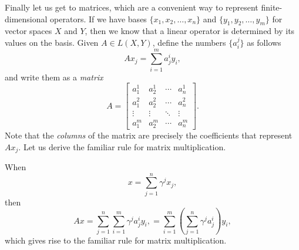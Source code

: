 \documentclass[12pt]{book}
\newcommand{\myindex}[1]{#1\index{#1}}
\theoremstyle{plain}
\theoremstyle{remark}
\theoremstyle{definition}
\theoremstyle{exercise}
\theoremstyle{example}
\begin{document}
Finally let us get to matrices, which are a convenient way to represent
finite-dimensional operators.
If we have bases $\{ x_1, x_2, \ldots, x_n \}$ and $\{ y_1, y_2, \ldots, y_m \}$
for vector spaces $X$ and $Y$, then we know that a linear operator is 
determined by its values on the basis.  Given $A \in L(X,Y)$,
define the numbers
$\{ a_i^j \}$ as follows
\begin{equation*}
A x_j = \sum_{i=1}^m a_j^i y_i ,
\end{equation*}
and write them as a \emph{\myindex{matrix}}
\begin{equation*}
A =
\begin{bmatrix}
a_1^1 & a_2^1 & \cdots & a_n^1 \\
a_1^2 & a_2^2 & \cdots & a_n^2 \\
\vdots & \vdots & \ddots & \vdots \\
a_1^m & a_2^m & \cdots & a_n^m
\end{bmatrix} .
\end{equation*}
Note that the \emph{\myindex{columns}} of the matrix are precisely the coefficients
that represent $A x_j$.
Let us derive the familiar rule for matrix multiplication.

When
\begin{equation*}
x = \sum_{j=1}^n \gamma^j x_j ,
\end{equation*}
then
\begin{equation*}
A x =
\sum_{j=1}^n \sum_{i=1}^m \gamma^j a_j^i y_i ,
=
\sum_{i=1}^m \left(\sum_{j=1}^n  \gamma^j a_j^i \right) y_i ,
\end{equation*}
which gives rise to the familiar rule for matrix multiplication.
\end{document}
